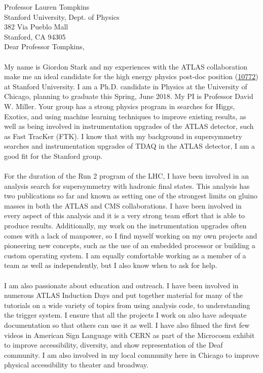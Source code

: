 \documentclass[11pt,letter]{article}
\begin{document}
\thispagestyle{fancy}

Professor Lauren Tompkins \\
Stanford University, Dept. of Physics \\
382 Via Pueblo Mall \\
Stanford, CA 94305 \\[0.5cm]

Dear Professor Tompkins, \\
\\
My name is Giordon Stark and my experiences with the ATLAS collaboration make me an ideal candidate for the high energy physics post-doc position (\href{https://academicjobsonline.org/ajo/jobs/10772}{10772}) at Stanford University. I am a Ph.D. candidate in Physics at the University of Chicago, planning to graduate this Spring, June 2018. My PI is Professor David W. Miller. Your group has a strong physics program in searches for Higgs, Exotics, and using machine learning techniques to improve existing results, as well as being involved in instrumentation upgrades of the ATLAS detector, such as Fast TracKer (FTK). I know that with my background in supersymmetry searches and instrumentation upgrades of TDAQ in the ATLAS detector, I am a good fit for the Stanford group.\\
\\
For the duration of the Run 2 program of the LHC, I have been involved in an analysis search for supersymmetry with hadronic final states. This analysis has two publications so far and known as setting one of the strongest limits on gluino masses in both the ATLAS and CMS collaborations. I have been involved in every aspect of this analysis and it is a very strong team effort that is able to produce results. Additionally, my work on the instrumentation upgrades often comes with a lack of manpower, so I find myself working on my own projects and pioneering new concepts, such as the use of an embedded processor or building a custom operating system. I am equally comfortable working as a member of a team as well as independently, but I also know when to ask for help.\\
\\
I am also passionate about education and outreach. I have been involved in numerous ATLAS Induction Days and put together material for many of the tutorials on a wide variety of topics from using analysis code, to understanding the trigger system. I ensure that all the projects I work on also have adequate documentation so that others can use it as well. I have also filmed the first few videos in American Sign Language with CERN as part of the Microcosm exhibit to improve accessibility, diversity, and show representation of the Deaf community. I am also involved in my local community here in Chicago to improve physical accessibility to theater and broadway. \\
\end{document}
